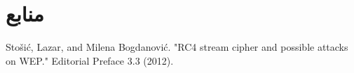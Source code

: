 \documentclass{article}
\begin{document}



\section*{منابع}
\renewcommand{\section}[2]{}%
\begin{thebibliography}{99} %


\begin{LTRitems}

\resetlatinfont

 Stošić, Lazar, and Milena Bogdanović. "RC4 stream cipher and possible attacks on WEP." Editorial Preface 3.3 (2012).
\end{LTRitems}

\end{thebibliography}
\end{document}
